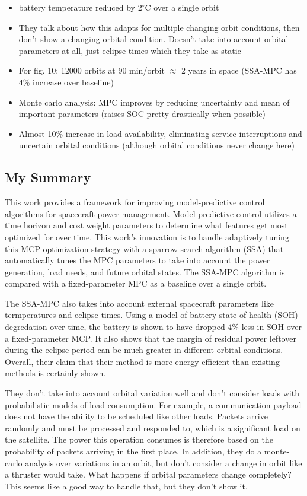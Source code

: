 \documentclass[11pt]{article}
\begin{document}
\begin{itemize}[noitemsep]
    \item battery temperature reduced by $2^{\circ}$C over a single orbit
    \item They talk about how this adapts for multiple changing orbit conditions, then don't show a changing orbital condition. Doesn't take into account orbital parameters at all, just eclipse times which they take as static
    \item For fig. 10: 12000 orbits at 90 min/orbit $\approx$ 2 years in space (SSA-MPC has 4\% increase over baseline)
    \item Monte carlo analysis: MPC improves by reducing uncertainty and mean of important parameters (raises SOC pretty drastically when possible)
    \item Almost 10\% increase in load availability, eliminating service interruptions and uncertain orbital conditions (although orbital conditions never change here)
\end{itemize}

\subsection{My Summary} 

This work provides a framework for improving model-predictive control algorithms for spacecraft power management. Model-predictive control utilizes a time horizon and cost weight parameters to determine what features get most optimized for over time. This work's innovation is to handle adaptively tuning this MCP optimization strategy with a sparrow-search algorithm (SSA) that automatically tunes the MPC parameters to take into account the power generation, load needs, and future orbital states. The SSA-MPC algorithm is compared with a fixed-parameter MPC as a baseline over a single orbit.

The SSA-MPC also takes into account external spacecraft parameters like termperatures and eclipse times. Using a model of battery state of health (SOH) degredation over time, the battery is shown to have dropped 4\% less in SOH over a fixed-parameter MCP. It also shows that the margin of residual power leftover during the eclipse period can be much greater in different orbital conditions. Overall, their claim that their method is more energy-efficient than existing methods is certainly shown.

They don't take into account orbital variation well and don't consider loads with probabilistic models of load consumption. For example, a communication payload does not have the ability to be scheduled like other loads. Packets arrive randomly and must be processed and responded to, which is a significant load on the satellite. The power this operation consumes is therefore based on the probability of packets arriving in the first place. In addition, they do a monte-carlo analysis over variations in an orbit, but don't consider a change in orbit like a thruster would take. What happens if orbital parameters change completely? This seems like a good way to handle that, but they don't show it. 
\end{document}
